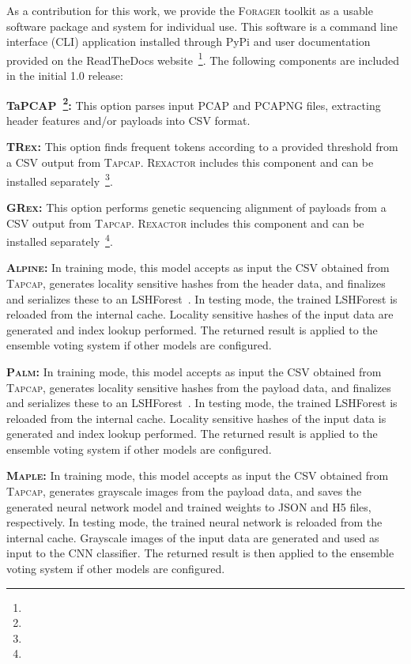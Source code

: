 As a contribution for this work, we provide the \textsc{Forager} toolkit as a usable software package and system for individual use. This software is a command line interface (CLI) application installed through PyPi and user documentation provided on the ReadTheDocs website~\footnote{}. The following components are included in the initial 1.0 release:

\medskip

\textbf{TaPCAP~\footnote{}: } This option parses input PCAP and PCAPNG files, extracting header features and/or payloads into CSV format.

\textbf{\textsc{TRex}: } This option finds frequent tokens according to a provided threshold from a CSV output from \textsc{Tapcap}. \textsc{Rexactor} includes this component and can be installed separately~\footnote{}.

\textbf{\textsc{GRex}: } This option performs genetic sequencing alignment of payloads from a CSV output from \textsc{Tapcap}. \textsc{Rexactor} includes this component and can be installed separately~\footnote{}.

\textbf{\textsc{Alpine}: } In training mode, this model accepts as input the CSV obtained from \textsc{Tapcap}, generates locality sensitive hashes from the header data, and finalizes and serializes these to an LSHForest~\cite{lshforest}. In testing mode, the trained LSHForest is reloaded from the internal cache. Locality sensitive hashes of the input data are generated and index lookup performed. The returned result is applied to the ensemble voting system if other models are configured.

\textbf{\textsc{Palm}: } In training mode, this model accepts as input the CSV obtained from \textsc{Tapcap}, generates locality sensitive hashes from the payload data, and finalizes and serializes these to an LSHForest~\cite{lshforest}. In testing mode, the trained LSHForest is reloaded from the internal cache. Locality sensitive hashes of the input data is generated and index lookup performed. The returned result is applied to the ensemble voting system if other models are configured.

\textbf{\textsc{Maple}: } In training mode, this model accepts as input the CSV obtained from \textsc{Tapcap}, generates grayscale images from the payload data, and saves the generated neural network model and trained weights to JSON and H5 files, respectively. In testing mode, the trained neural network is reloaded from the internal cache. Grayscale images of the input data are generated and used as input to the CNN classifier. The returned result is then applied to the ensemble voting system if other models are configured.

